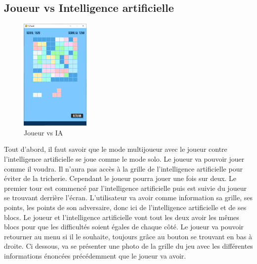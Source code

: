 \documentclass[a4paper]{report}
\begin{document}
\subsection{Joueur vs Intelligence artificielle}
\begin{figure}
    \centering
    \includegraphics[width=0.3\textwidth, trim=0pt 0pt 0pt 30pt]{images/3-playwithai.png}
    \caption{Joueur vs IA}
    \vspace{-10pt}
\end{figure}
Tout d'abord, il faut savoir que le mode multijoueur avec le joueur contre l'intelligence artificielle se joue comme le mode solo. Le joueur va pouvoir jouer comme il voudra. Il n'aura pas accès à la grille de l'intelligence artificielle pour éviter de la tricherie. Cependant le joueur pourra jouer une fois sur deux. Le premier tour est commencé par l'intelligence artificielle puis est suivie du joueur se trouvant derrière l'écran. L'utilisateur va avoir comme information sa grille, ses points, les points de son adversaire, donc ici de l'intelligence artificielle et de ses blocs. Le joueur et l'intelligence artificielle vont tout les deux avoir les mêmes blocs pour que les difficultés soient égales de chaque côté. Le joueur va pouvoir retourner au menu si il le souhaite, toujours grâce au bouton se trouvant en bas à droite. Ci dessous, va se présenter une photo de la grille du jeu avec les différentes informations énoncées précédemment que le joueur va avoir.\\
\end{document}
